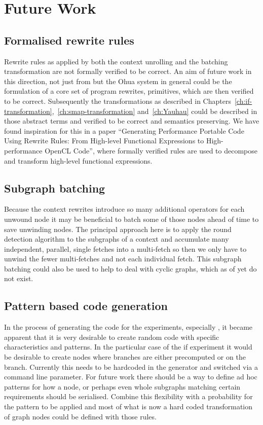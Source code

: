 \chapter{Future Work}

\label{ch:future-work}

\section{Formalised rewrite rules}

Rewrite rules as applied by both the context unrolling and the batching transformation are not formally verified to be correct.
An aim of future work in this direction, not just from \yauhau{} but the Ohua system in general could be the formulation of a core set of program rewrites, primitives, which are then verified to be correct.
Subsequently the transformations as described in Chapters~\ref{ch:if-transformation},~\ref{ch:smap-transformation} and~\ref{ch:Yauhau} could be described in those abstract terms and verified to be correct and semantics preserving.
We have found inspiration for this in a paper ``Generating Performance Portable Code Using Rewrite Rules: From High-level Functional Expressions to High-performance OpenCL Code''\cite{Steuwer:2015:GPP:2858949.2784754}, where formally verified rules are used to decompose and transform high-level functional expressions.

\section{Subgraph batching}

Because the context rewrites introduce so many additional operators for each unwound node it may be beneficial to batch some of those nodes ahead of time to save unwinding nodes.
The principal approach here is to apply the round detection algorithm to the subgraphs of a context and accumulate many independent, parallel, single fetches into a multi-fetch so then we only have to unwind the fewer multi-fetches and not each individual fetch.
This subgraph batching could also be used to help \yauhau{} to deal with cyclic graphs, which as of yet do not exist.

\section{Pattern based code generation}

In the process of generating the code for the experiments, especially \ifop{}, it became apparent that it is very desirable to create random code with specific characteristics and patterns.
In the particular case of the if experiment it would be desirable to create nodes where branches are either precomputed or on the branch.
Currently this needs to be hardcoded in the generator and switched via a command line parameter.
For future work there should be a way to define ad hoc patterns for how a node, or perhaps even whole subgraphs matching certain requirements should be serialised.
Combine this flexibility with a probability for the pattern to be applied and most of what is now a hard coded transformation of graph nodes could be defined with those rules.
